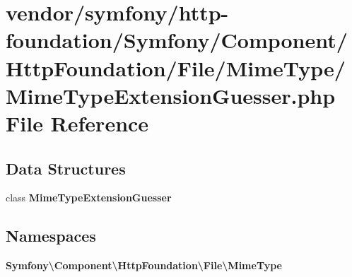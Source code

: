 \section{vendor/symfony/http-\/foundation/\+Symfony/\+Component/\+Http\+Foundation/\+File/\+Mime\+Type/\+Mime\+Type\+Extension\+Guesser.php File Reference}
\label{_mime_type_extension_guesser_8php}
\subsection*{Data Structures}
\begin{DoxyCompactItemize}
\item 
class {\bf Mime\+Type\+Extension\+Guesser}
\end{DoxyCompactItemize}
\subsection*{Namespaces}
\begin{DoxyCompactItemize}
\item 
 {\bf Symfony\textbackslash{}\+Component\textbackslash{}\+Http\+Foundation\textbackslash{}\+File\textbackslash{}\+Mime\+Type}
\end{DoxyCompactItemize}
